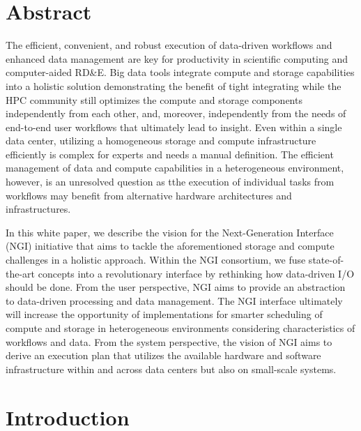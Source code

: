 \documentclass[a4paper, twocolumn]{article}
\title{\papertitle}
\author{Julian M. Kunkel \\
  \textit{University of Reading}
	\and
  A
  \and
  B
  \and
  C
}
\date{\today}
\begin{document}
\maketitle
\thispagestyle{fancy}

\section*{Abstract}

The efficient, convenient, and robust execution of data-driven workflows and enhanced data management are key for productivity in scientific computing and computer-aided RD\&E.
Big data tools integrate compute and storage capabilities into a holistic solution demonstrating the benefit of tight integrating while the HPC community still optimizes the compute and storage components independently from each other, and, moreover, independently from the needs of end-to-end user workflows  that ultimately lead to insight.
Even within a single data center, utilizing a homogeneous storage and compute infrastructure efficiently is complex for experts and needs a manual definition.
The efficient management of data and compute capabilities in a heterogeneous environment, however, is an unresolved question as tthe execution of individual tasks from workflows may benefit from alternative hardware architectures and infrastructures.

In this white paper, we describe the vision for the Next-Generation Interface (NGI) initiative that aims to tackle the aforementioned storage and compute challenges in a holistic approach.
Within the NGI consortium, we fuse state-of-the-art concepts into a revolutionary interface by rethinking how data-driven I/O should be done.
From the user perspective, NGI aims to provide an abstraction to data-driven processing and data management.
The NGI interface ultimately will increase the opportunity of implementations for smarter scheduling of compute and storage in heterogeneous environments considering characteristics of workflows and data.
From the system perspective, the vision of NGI aims to derive an execution plan that utilizes the available hardware and software infrastructure within and across data centers but also on small-scale systems.

\section{Introduction}
\end{document}
